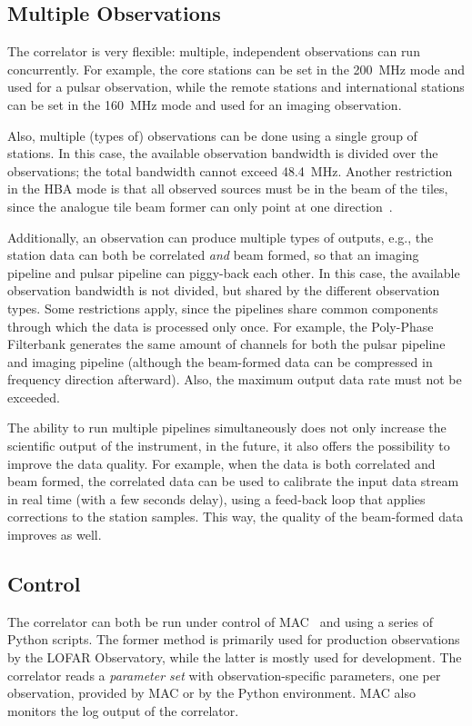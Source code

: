 \subsection{Multiple Observations}

The correlator is very flexible: multiple, independent observations can
run concurrently.
For example, the core stations can be set in the 200~MHz mode and used for
a pulsar observation, while the remote stations and international stations
can be set in the 160~MHz mode and used for an imaging observation.

Also, multiple (types of) observations can be done using a single group of
stations.
In this case, the available observation bandwidth is divided over the
observations; the total bandwidth cannot exceed 48.4~MHz.
Another restriction in the HBA mode is that all observed sources must be in the
beam of the tiles, since the analogue tile beam former can only point at one
direction~\cite{?}.

Additionally, an observation can produce multiple types of outputs, e.g.,
the station data can both be correlated \emph{and\/} beam formed, so that
an imaging pipeline and pulsar pipeline can piggy-back each other.
In this case, the available observation bandwidth is not divided, but shared
by the different observation types.
Some restrictions apply, since the pipelines share common components through
which the data is processed only once.
For example, the Poly-Phase Filterbank generates the same amount of channels
for both the pulsar pipeline and imaging pipeline (although the beam-formed
data can be compressed in frequency direction afterward).
Also, the maximum output data rate must not be exceeded.

The ability to run multiple pipelines simultaneously does not only increase
the scientific output of the instrument, in the future, it also offers the
possibility to improve the data quality.
For example, when the data is both correlated and beam formed, the correlated
data can be used to calibrate the input data stream in real time (with a few
seconds delay), using a feed-back loop that applies corrections to the station
samples.
This way, the quality of the beam-formed data improves as well.


\subsection{Control}

The correlator can both be run under control of MAC~\cite{Overeem:10} and
using a series of Python scripts.
The former method is primarily used for production observations by the
LOFAR Observatory, while the latter is mostly used for development.
The correlator reads a \emph{parameter set\/} with observation-specific
parameters, one per observation, provided by MAC or by the Python environment.
MAC also monitors the log output of the correlator.


